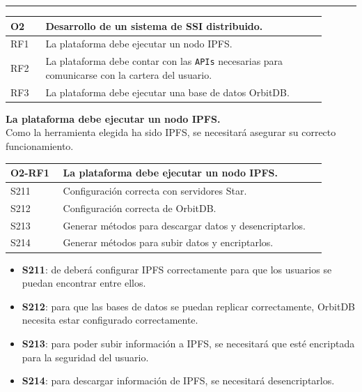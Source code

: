 \noindent\rule{\textwidth}{0.4pt}
\begin{center}
    \begin{table}[h!]
        \begin{tabular}{|p{0.1\linewidth} | p{0.8\linewidth}|}
            \hline
             
            \textbf{O2} & \textbf{Desarrollo de un sistema de SSI distribuido.} \\
            \hline
            RF1     & La plataforma debe ejecutar un nodo IPFS. \\
            \hline
            RF2     & La plataforma debe contar con las \verb|APIs| necesarias para comunicarse con la cartera del usuario.\\
            \hline
            RF3     & La plataforma debe ejecutar una base de datos OrbitDB. \\
            \hline
        \end{tabular}
    \end{table}
\end{center}
\textbf{La plataforma debe ejecutar un nodo IPFS.}\\
Como la herramienta elegida ha sido IPFS, se necesitará asegurar su correcto funcionamiento.
\begin{center}
    \begin{table}[h!]
        \begin{tabular}{|p{0.15\linewidth} | p{0.75\linewidth}|}
            \hline
             
            \textbf{O2-RF1} & \textbf{La plataforma debe ejecutar un nodo IPFS.} \\
            \hline
            S211     & Configuración correcta con servidores Star. \\
            \hline
            S212     & Configuración correcta de OrbitDB. \\
            \hline
            S213     & Generar métodos para descargar datos y desencriptarlos. \\
            \hline
            S214     & Generar métodos para subir datos y encriptarlos. \\
            \hline
        \end{tabular}
    \end{table}
\end{center}
\begin{itemize}
    \item \textbf{S211}: de deberá configurar IPFS correctamente para que los usuarios se puedan encontrar entre ellos.
    \item \textbf{S212}: para que las bases de datos se puedan replicar correctamente, OrbitDB necesita estar configurado correctamente.
    \item \textbf{S213}: para poder subir información a IPFS, se necesitará que esté encriptada para la seguridad del usuario.
    \item \textbf{S214}: para descargar información de IPFS, se necesitará desencriptarlos.
\end{itemize}
